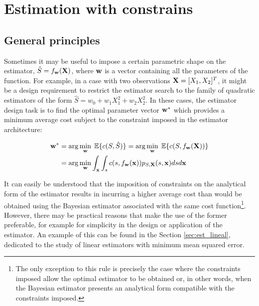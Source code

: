 \section{Estimation with constrains}


\subsection{General principles}

Sometimes it may be useful to impose a certain parametric shape on the estimator, $\hat S = f_{\bf w}(\bf X)$, where ${\bf w}$ is a vector containing all the parameters of the function. For example, in a case with two observations ${\bf X} = [X_1, X_2]^T$, it might be a design requirement to restrict the estimator search to the family of quadratic estimators of the form $\hat S = w_0 + w_1 X_1^2 + w_2 X_2^2$. In these cases, the estimator design task is to find the optimal parameter vector ${\bf w}^*$ which provides a minimum average cost subject to the constraint imposed in the estimator architecture:

\begin{align}
{\bf w}^* & = \arg\min_{\bf w}\; \mathbb{E}\{c(S,\hat S)\} = \arg\min_{\bf w} \; \mathbb{E}\{c(S,f_{\bf w}({\bf X}))\} \nonumber\\
 &= \arg\min_{\bf w} \int_{\bf x} \int_s c(s,f_{\bf w}({\bf x})) p_{S,{\bf X}}(s,{\bf x}) ds d{\bf x}
\end{align}

It can easily be understood that the imposition of constraints on the analytical form of the estimator results in incurring a higher average cost than would be obtained using the Bayesian estimator associated with the same cost function\footnote{The only exception to this rule is precisely the case where the constraints imposed allow the optimal estimator to be obtained or, in other words, when the Bayesian estimator presents an analytical form compatible with the constraints imposed.}. However, there may be practical reasons that make the use of the former preferable, for example for simplicity in the design or application of the estimator. An example of this can be found in the Section \ref{sec:est_lineal}, dedicated to the study of linear estimators with minimum mean squared error.

